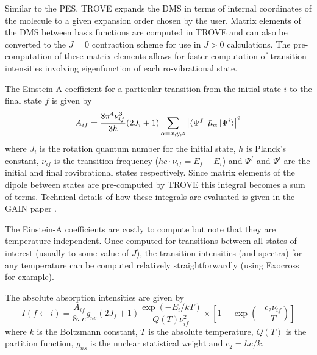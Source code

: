 Similar to the PES, TROVE expands the DMS in terms of internal coordinates of the molecule to a given expansion order chosen
by the user. Matrix elements of the DMS between basis functions are computed in TROVE and can also be converted to the 
$J=0$ contraction scheme for use in $J>0$ calculations. The pre-computation of these matrix elements allows for faster
computation of transition intensities involving eigenfunction of each ro-vibrational state.

The Einstein-A coefficient for a particular transition from the initial state $i$ to the final state $f$ is given by
\begin{equation}
\label{eq.einsteinA}
A_{if} = \frac{8 \pi^4 \nu^3_{if}}{3h} (2J_i + 1) \sum_{\alpha = x, y, z} \left|
 \bra{\Psi^f}  \bar{\mu}_{\alpha} \ket{\Psi^i}  \right| ^2
\end{equation}
where $J_i$ is the rotation quantum number for the initial state, $h$ is Planck's constant, $\nu_{if}$ is the
transition frequency ($hc \cdot \nu_{if} = E_f - E_i$) and $\Psi^f$ and $\Psi^i$ are the initial and final rovibrational states
respectively. Since matrix elements of the dipole between states are pre-computed by TROVE this integral becomes a sum
of terms. Technical details of how these integrals are evaluated is given in the GAIN paper \cite{GAIN}. 

The Einstein-A coefficients are costly to compute but note that they are temperature independent. Once computed for transitions
between all states of interest (usually to some value of $J$), the transition intensities (and spectra) 
for any temperature can be computed relatively straightforwardly (using Exocross \cite{Exocross} for example). 

The absolute absorption intensities are given by 
\begin{equation}
\label{eq.intensity}
I(f \leftarrow i) = \frac{A_{if}}{8 \pi c} g_{ns} (2 J_f + 1) \frac{\exp(-E_i/kT) }{Q(T) \nu^2_{if}}
\times \left[ 1 - \exp\left( - \frac{c_2 \nu_{if}}{T} \right) \right]
\end{equation}
where $k$ is the Boltzmann constant, $T$ is the absolute temperature, $Q(T)$ is the partition function, $g_{ns}$ is the 
nuclear statistical weight and $c_2 = hc/k$. 


















